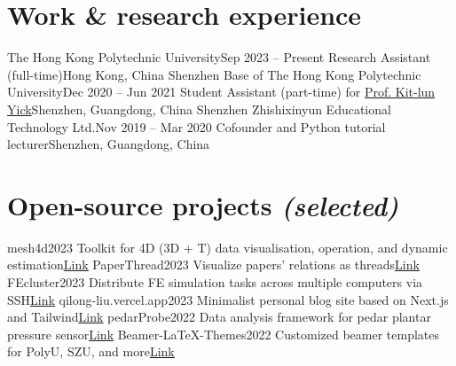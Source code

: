 \documentclass[letterpaper,11pt]{article}
\begin{document}
    \section{Work \& research experience}

    \resumeSubHeadingListStart
        \resumeSubheading
            {The Hong Kong Polytechnic University}{Sep 2023 -- Present}
            {Research Assistant (full-time)}{Hong Kong, China}
        \resumeSubheading
            {Shenzhen Base of The Hong Kong Polytechnic University}{Dec 2020 -- Jun 2021}
            {Student Assistant (part-time) for \href{https://research.polyu.edu.hk/en/persons/kit-lun-yick}{Prof. Kit-lun Yick}}{Shenzhen, Guangdong, China}
        \resumeSubheading
            {Shenzhen Zhishixinyun Educational Technology Ltd.}{Nov 2019 -- Mar 2020}
            {Cofounder and Python tutorial lecturer}{Shenzhen, Guangdong, China}
    \resumeSubHeadingListEnd

    \section{Open-source projects \emph{(selected)}}

    \resumeSubHeadingListStart
        \resumeSubheading
            {mesh4d}{2023}
            {Toolkit for 4D (3D + T) data visualisation, operation, and dynamic estimation}{\href{https://github.com/liu-qilong/mesh4d}{\underline{Link}}}
        \resumeSubheading
            {PaperThread}{2023}
            {Visualize papers' relations as threads}{\href{https://github.com/liu-qilong/obsidian-setup}{\underline{Link}}}
        \resumeSubheading
            {FEcluster}{2023}
            {Distribute FE simulation tasks across multiple computers via SSH}{\href{https://github.com/liu-qilong/FEcluster}{\underline{Link}}}
        \resumeSubheading
            {qilong-liu.vercel.app}{2023}
            {Minimalist personal blog site based on Next.js and Tailwind}{\href{https://github.com/liu-qilong/qilong-liu}{\underline{Link}}}
        \resumeSubheading
            {pedarProbe}{2022}
            {Data analysis framework for pedar plantar pressure sensor}{\href{https://github.com/liu-qilong/pedarProbe}{\underline{Link}}}
        \resumeSubheading
            {Beamer-LaTeX-Themes}{2022}
            {Customized beamer templates for PolyU, SZU, and more}{\href{https://github.com/liu-qilong/Beamer-LaTeX-Themes}{\underline{Link}}}
    \resumeSubHeadingListEnd
\end{document}

